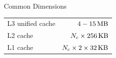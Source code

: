 \documentclass[9pt,xcolor=table]{beamer}
\begin{document}
\begin{frame}
\begin{columns}[c]
\begin{column}{.45\textwidth}
    \begin{block}{Common Dimensions}
      \begin{tabular}[h]{lr}
        L3 unified cache & $\unit[4-15]{MB}$ \\
        L2 cache & $N_{c}\times\unit[256]{KB}$ \\
        L1 cache & $N_{c}\times2\times\unit[32]{KB}$
      \end{tabular}
    \end{block}
    \vfill
  \end{column}
\end{columns}
\end{frame}
\end{document}
